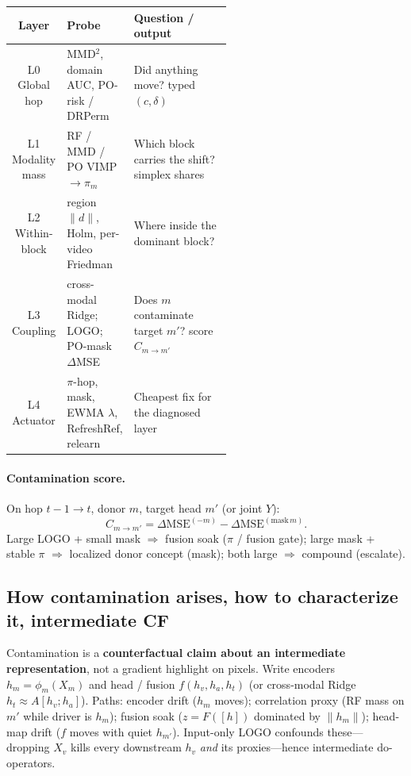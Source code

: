\begin{center}
\small
\begin{tabular}{@{}clp{0.55\linewidth}@{}}
\toprule
Layer & Probe & Question / output \\
\midrule
L0 Global hop & MMD$^2$, domain AUC, PO-risk / DRPerm & Did anything move? typed $(c,\delta)$ \\
L1 Modality mass & RF / MMD / PO VIMP $\to\pi_m$ & Which block carries the shift? simplex shares \\
L2 Within-block & region $\|d\|$, Holm, per-video Friedman & Where inside the dominant block? \\
L3 Coupling & cross-modal Ridge; LOGO; PO-mask $\Delta$MSE & Does $m$ contaminate target $m'$? score $C_{m\to m'}$ \\
L4 Actuator & $\pi$-hop, mask, EWMA $\lambda$, RefreshRef, relearn & Cheapest fix for the diagnosed layer \\
\bottomrule
\end{tabular}
\end{center}

\paragraph{Contamination score.}
On hop $t{-}1\to t$, donor $m$, target head $m'$ (or joint $Y$):
\[
  C_{m\to m'}
  =
  \Delta\mathrm{MSE}^{(-m)}
  -
  \Delta\mathrm{MSE}^{(\mathrm{mask}\,m)}.
\]
Large LOGO + small mask $\Rightarrow$ fusion soak ($\pi$ / fusion gate);
large mask + stable $\pi$ $\Rightarrow$ localized donor concept (mask);
both large $\Rightarrow$ compound (escalate).

\subsection{How contamination arises, how to characterize it, intermediate CF}
\label{sec:intermediate-cf}

Contamination is a \textbf{counterfactual claim about an intermediate
representation}, not a gradient highlight on pixels.
Write encoders $h_m=\phi_m(X_m)$ and head / fusion $f(h_v,h_a,h_t)$
(or cross-modal Ridge $h_t\approx A[h_v;h_a]$).
Paths: encoder drift ($h_m$ moves); correlation proxy (RF mass on $m'$ while
driver is $h_m$); fusion soak ($z=F([h])$ dominated by $\|h_m\|$);
head-map drift ($f$ moves with quiet $h_{m'}$).
Input-only LOGO confounds these---dropping $X_v$ kills every downstream
$h_v$ \emph{and} its proxies---hence intermediate do-operators.

